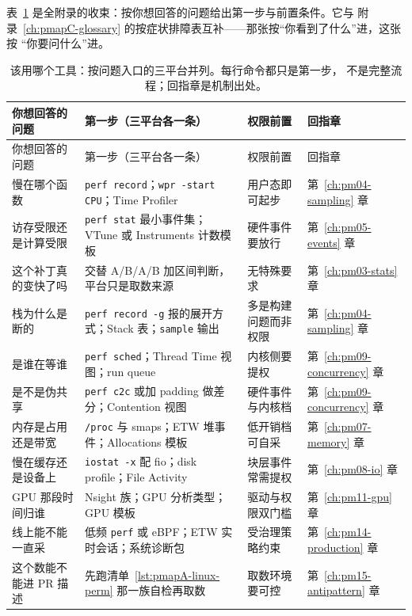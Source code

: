 \documentclass[12pt,a4paper,fontset=fandol]{ctexbook}
\newcommand{\Tp}[1]{\texttt{#1}}
\begin{document}
表~\ref{tab:pmapA-decision} 是全附录的收束：按你想回答的问题给出第一步与前置条件。它与
附录~\ref{ch:pmapC-glossary} 的按症状排障表互补——那张按``你看到了什么''进，这张按
``你要问什么''进。

\begin{longtable}{>{\raggedright\arraybackslash}p{}
                  >{\raggedright\arraybackslash}p{}
                  >{\raggedright\arraybackslash}p{}
                  >{\raggedright\arraybackslash}p{}}
\caption{\label{tab:pmapA-decision}该用哪个工具：按问题入口的三平台并列。每行命令都只是第一步，
不是完整流程；回指章是机制出处。}\\
你想回答的问题 & 第一步（三平台各一条） & 权限前置 & 回指章 \\
\hline
\endfirsthead
\hline
你想回答的问题 & 第一步（三平台各一条） & 权限前置 & 回指章 \\
\hline
\endhead
慢在哪个函数 & \Tp{perf record}；\Tp{wpr -start CPU}；Time Profiler & 用户态即可起步 &
  第~\ref{ch:pm04-sampling} 章 \\
\hline
访存受限还是计算受限 & \Tp{perf stat} 最小事件集；VTune 或 Instruments 计数模板 &
  硬件事件要放行 & 第~\ref{ch:pm05-events} 章 \\
\hline
这个补丁真的变快了吗 & 交替 A/B/A/B 加区间判断，平台只是取数来源 & 无特殊要求 &
  第~\ref{ch:pm03-stats} 章 \\
\hline
栈为什么是断的 & \Tp{perf record -g} 报的展开方式；Stack 表；\Tp{sample} 输出 &
  多是构建问题而非权限 & 第~\ref{ch:pm04-sampling} 章 \\
\hline
是谁在等谁 & \Tp{perf sched}；Thread Time 视图；run queue & 内核侧要提权 &
  第~\ref{ch:pm09-concurrency} 章 \\
\hline
是不是伪共享 & \Tp{perf c2c} 或加 padding 做差分；Contention 视图 & 硬件事件与内核档 &
  第~\ref{ch:pm09-concurrency} 章 \\
\hline
内存是占用还是带宽 & \Tp{/proc} 与 smaps；ETW 堆事件；Allocations 模板 & 低开销档可自采 &
  第~\ref{ch:pm07-memory} 章 \\
\hline
慢在缓存还是设备上 & \Tp{iostat -x} 配 fio；disk profile；File Activity & 块层事件常需提权 &
  第~\ref{ch:pm08-io} 章 \\
\hline
GPU 那段时间归谁 & Nsight 族；GPU 分析类型；GPU 模板 & 驱动与权限双门槛 &
  第~\ref{ch:pm11-gpu} 章 \\
\hline
线上能不能一直采 & 低频 \Tp{perf} 或 eBPF；ETW 实时会话；系统诊断包 & 受治理策略约束 &
  第~\ref{ch:pm14-production} 章 \\
\hline
这个数能不能进 PR 描述 & 先跑清单~\ref{lst:pmapA-linux-perm} 那一族自检再取数 & 取数环境要可控 &
  第~\ref{ch:pm15-antipattern} 章 \\
\hline
\end{longtable}
\end{document}
